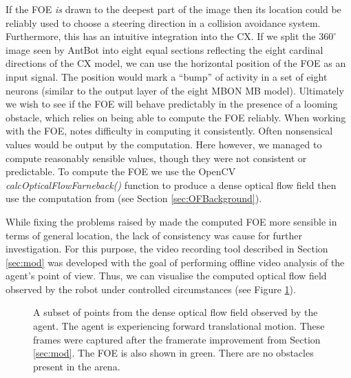 \documentclass[a4paper,11pt,twoside,openright]{article}
\begin{document}
If the FOE \textit{is} drawn to the deepest part of the image then its location
could be reliably used to choose a steering direction in a collision avoidance
system. Furthermore, this has an
intuitive integration into the CX. If we split the $360^{\circ}$ image seen by
AntBot into eight equal sections reflecting the eight cardinal directions of the
CX model, we can use the horizontal position of the FOE as an input signal. The
position would mark a ``bump'' of activity in a set of eight neurons (similar to
the output layer of the eight MBON MB model). Ultimately we wish to see if the
FOE will behave predictably in the presence of a looming obstacle, which relies
on being able to compute the FOE reliably.
When working with the FOE, \cite{Mitchell2018} notes difficulty in computing it
consistently. Often nonsensical values would be output by the computation. Here
however, we managed to compute reasonably sensible values, though they were not
consistent or predictable. To compute the FOE we use the OpenCV
\textit{calcOpticalFlowFarneback()} function to produce a dense optical flow
field then use the computation from \cite{ODonovan2005} (see Section
\ref{sec:OFBackground}).
\newline
\par

While fixing the problems raised by \cite{Mitchell2018} made the computed FOE
more sensible in terms of general location, the lack of consistency was cause
for further investigation. For this purpose, the video recording tool described
in Section \ref{sec:mod} was developed with the goal of performing offline
video analysis of the agent's point of view. Thus, we can visualise the
computed optical flow field observed by the robot under controlled circumstances
(see Figure \ref{fig:flowfield}).

\begin{figure}[h!]
  \centering
  \caption{\label{fig:flowfield}
    A subset of points from the dense optical flow field observed by the agent.
    The agent is experiencing forward translational motion. These frames were
    captured after the framerate improvement from Section \ref{sec:mod}. The
    FOE is also shown in green. There are no obstacles present in the arena.
  }
\end{figure}
\end{document}
